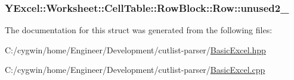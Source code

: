 \subsubsection[{unused2\+\_\+}]{ Y\+Excel\+::\+Worksheet\+::\+Cell\+Table\+::\+Row\+Block\+::\+Row\+::unused2\+\_\+}\label{struct_y_excel_1_1_worksheet_1_1_cell_table_1_1_row_block_1_1_row_a0f9c7dbe4422422fef0255609a1ca959}


The documentation for this struct was generated from the following files\+:\begin{DoxyCompactItemize}
\item 
C\+:/cygwin/home/\+Engineer/\+Development/cutlist-\/parser/\hyperlink{_basic_excel_8hpp}{Basic\+Excel.\+hpp}\item 
C\+:/cygwin/home/\+Engineer/\+Development/cutlist-\/parser/\hyperlink{_basic_excel_8cpp}{Basic\+Excel.\+cpp}\end{DoxyCompactItemize}
